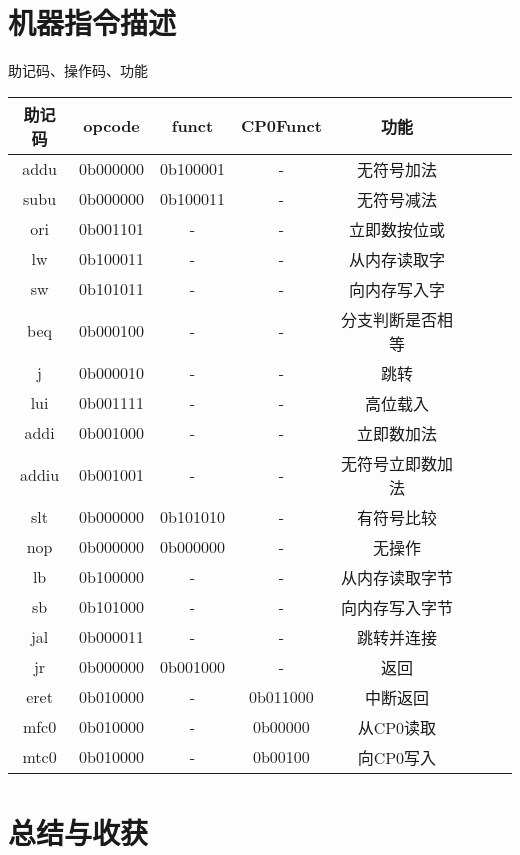 \documentclass[scheme = chinese]{ctexart}
\begin{document}
\part{机器指令描述}
助记码、操作码、功能
\begin{center}
    \begin{tabular}{cccccccc}
        \toprule
        助记码 & opcode & funct & CP0Funct & 功能 \\
        \midrule
        addu & 0b000000 & 0b100001 & - & 无符号加法 \\
        subu & 0b000000 & 0b100011 & - & 无符号减法 \\
        ori & 0b001101 & - & - & 立即数按位或 \\
        lw & 0b100011 & - & - & 从内存读取字 \\
        sw & 0b101011 & - & - & 向内存写入字 \\
        beq & 0b000100 & - & - & 分支判断是否相等 \\
        j & 0b000010 & - & - & 跳转 \\
        lui & 0b001111 & - & - & 高位载入 \\
        addi & 0b001000 & - & - & 立即数加法 \\
        addiu & 0b001001 & - & - & 无符号立即数加法 \\
        slt & 0b000000 & 0b101010 & - & 有符号比较 \\
        nop & 0b000000 & 0b000000 & - & 无操作 \\
        lb & 0b100000 & - & - & 从内存读取字节 \\
        sb & 0b101000 & - & - & 向内存写入字节 \\
        jal & 0b000011 & - & - & 跳转并连接 \\
        jr & 0b000000 & 0b001000 & - & 返回 \\
        eret & 0b010000 & - & 0b011000 & 中断返回 \\
        mfc0 & 0b010000 & - & 0b00000 & 从CP0读取 \\
        mtc0 & 0b010000 & - & 0b00100 & 向CP0写入 \\
        \bottomrule
    \end{tabular}
\end{center}
\clearpage

\part{总结与收获}
\setcounter{section}{0}

\clearpage
\end{document}
